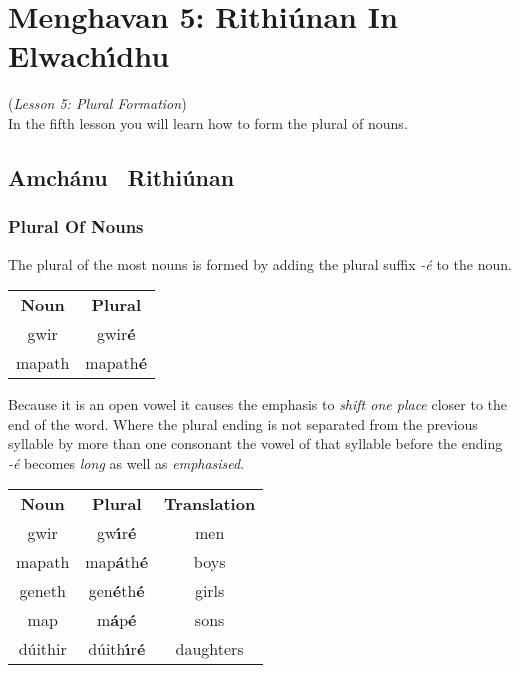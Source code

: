 \section{Menghavan 5: Rithi\'{u}nan In Elwach\'{\i}dhu}
(\textit{Lesson 5: Plural Formation})\\

In the fifth lesson you will learn how to form the plural of nouns.\\

\subsection{Amch\'{a}nu \textendash\ Rithi\'{u}nan}
\subsubsection{Plural Of Nouns}

The plural of the most nouns is formed by adding the plural suffix \textit{-\'{e}} to the noun.
\begin{table}[H]
\centering
\begin{tabular}{cc}
  \toprule
  \textbf{Noun} & \textbf{Plural}\\
  \cmidrule(lr){1-1}\cmidrule(lr){2-2}
  gwir & gwir\textbf{\'{e}}\\
  mapath & mapath\textbf{\'{e}}\\
  \bottomrule
\end{tabular}
\label{example_noun_plural}
\end{table}

Because it is an open vowel it causes the emphasis to \textit{shift one place} closer to the end of the word. Where the plural ending is not separated from the previous syllable by more than one consonant the vowel of that syllable before the ending \textit{-\'{e}} becomes \textit{long} as well as \textit{emphasised}.
\begin{table}[H]
\centering
\begin{tabular}{ccc}
  \toprule
  \textbf{Noun} & \textbf{Plural} & \textbf{Translation}\\
  \cmidrule(lr){1-1}\cmidrule(lr){2-2}\cmidrule(lr){3-3}
  gwir & gw\textbf{\'{\i}}r\textbf{\'{e}} & men\\
  mapath & map\textbf{\'{a}}th\textbf{\'{e}} & boys\\
  geneth & gen\textbf{\'{e}}th\textbf{\'{e}} & girls\\
  map & m\textbf{\'{a}}p\textbf{\'{e}} & sons\\
  d\'{u}ithir & d\'{u}ith\textbf{\'{\i}}r\textbf{\'{e}} & daughters\\
  \bottomrule
\end{tabular}
\label{example_emphasis_shift}
\end{table}

